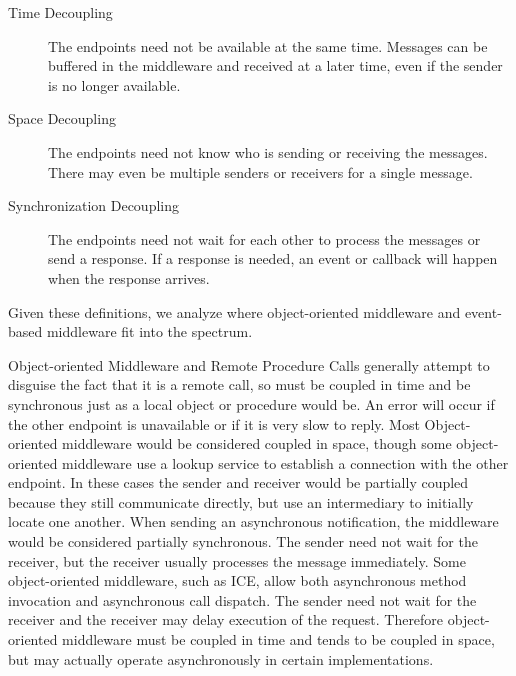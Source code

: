 \documentclass{acm_proc_article-sp}
\begin{document}
\begin{description}
\item[Time Decoupling] The endpoints need not be available at the same time. Messages can be buffered in the middleware and received at a later time, even if the sender is no longer available.
\item[Space Decoupling] The endpoints need not know who is sending or receiving the messages. There may even be multiple senders or receivers for a single message.
\item[Synchronization Decoupling] The endpoints need not wait for each other to process the messages or send a response. If a response is needed, an event or callback will happen when the response arrives.
\end{description}

Given these definitions, we analyze where object-oriented middleware and event-based middleware fit into the spectrum.

Object-oriented Middleware and Remote Procedure Calls generally attempt to disguise the fact that it is a remote call, so must be coupled in time and be synchronous just as a local object or procedure would be. An error will occur if the other endpoint is unavailable or if it is very slow to reply. Most Object-oriented middleware would be considered coupled in space, though some object-oriented middleware use a lookup service to establish a connection with the other endpoint. In these cases the sender and receiver would be partially coupled because they still communicate directly, but use an intermediary to initially locate one another. When sending an asynchronous notification, the middleware would be considered partially synchronous. The sender need not wait for the receiver, but the receiver usually processes the message immediately.  Some object-oriented middleware, such as ICE, allow both asynchronous method invocation and asynchronous call dispatch.  The sender need not wait for the receiver and the receiver may delay execution of the request.  Therefore object-oriented middleware must be coupled in time and tends to be coupled in space, but may actually operate asynchronously in certain implementations.
\end{document}
